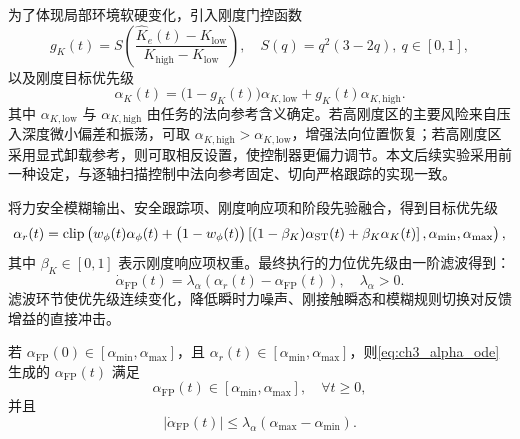为了体现局部环境软硬变化，引入刚度门控函数
\begin{equation}
  g_K(t)=S\left(\frac{\hat K_e(t)-K_{\mathrm{low}}}{K_{\mathrm{high}}-K_{\mathrm{low}}}\right),
  \quad
  S(q)=q^2(3-2q),\ q\in[0,1],
  \label{eq:ch3_gK}
\end{equation}
以及刚度目标优先级
\begin{equation}
  \alpha_K(t)=\bigl(1-g_K(t)\bigr)\alpha_{K,\mathrm{low}}+g_K(t)\alpha_{K,\mathrm{high}} .
  \label{eq:ch3_alphaK}
\end{equation}
其中 $\alpha_{K,\mathrm{low}}$ 与 $\alpha_{K,\mathrm{high}}$ 由任务的法向参考含义确定。若高刚度区的主要风险来自压入深度微小偏差和振荡，可取 $\alpha_{K,\mathrm{high}}>\alpha_{K,\mathrm{low}}$，增强法向位置恢复；若高刚度区采用显式卸载参考，则可取相反设置，使控制器更偏力调节。本文后续实验采用前一种设定，与逐轴扫描控制中法向参考固定、切向严格跟踪的实现一致。

将力安全模糊输出、安全跟踪项、刚度响应项和阶段先验融合，得到目标优先级
\begin{equation}
  \alpha_r(t)=
  \operatorname{clip}\left(
  w_\phi(t)\alpha_\phi(t)
  +\bigl(1-w_\phi(t)\bigr)
  \left[(1-\beta_K)\alpha_{\mathrm{ST}}(t)+\beta_K\alpha_K(t)\right],
  \alpha_{\min},\alpha_{\max}
  \right),
  \label{eq:ch3_alpha_r}
\end{equation}
其中 $\beta_K\in[0,1]$ 表示刚度响应项权重。最终执行的力位优先级由一阶滤波得到：
\begin{equation}
  \dot\alpha_{\mathrm{FP}}(t)=\lambda_{\alpha}(\alpha_r(t)-\alpha_{\mathrm{FP}}(t)),\quad \lambda_\alpha>0 .
  \label{eq:ch3_alpha_ode}
\end{equation}
滤波环节使优先级连续变化，降低瞬时力噪声、刚接触瞬态和模糊规则切换对反馈增益的直接冲击。

\begin{lemma}[力位优先级的区间不变性与变化率上界]
\label{lem:ch3_alpha_bound}
若 $\alpha_{\mathrm{FP}}(0)\in[\alpha_{\min},\alpha_{\max}]$，且 $\alpha_r(t)\in[\alpha_{\min},\alpha_{\max}]$，则\eqref{eq:ch3_alpha_ode}生成的 $\alpha_{\mathrm{FP}}(t)$ 满足
\begin{equation}
  \alpha_{\mathrm{FP}}(t)\in[\alpha_{\min},\alpha_{\max}],\quad \forall t\ge0,
  \label{eq:ch3_alpha_interval}
\end{equation}
并且
\begin{equation}
  |\dot\alpha_{\mathrm{FP}}(t)|\le \lambda_\alpha(\alpha_{\max}-\alpha_{\min}).
  \label{eq:ch3_alpha_rate}
\end{equation}
\end{lemma}

